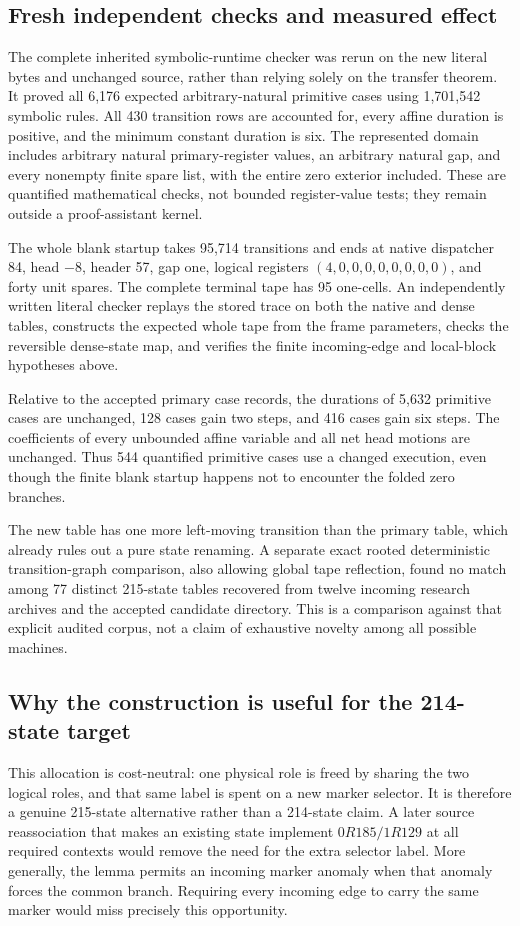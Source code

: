 \subsection{Fresh independent checks and measured effect}

The complete inherited symbolic-runtime checker was rerun on the new literal
bytes and unchanged source, rather than relying solely on the transfer theorem.
It proved all 6,176 expected arbitrary-natural primitive cases using
1,701,542 symbolic rules.  All 430 transition rows are accounted for, every
affine duration is positive, and the minimum constant duration is six.
The represented domain includes arbitrary natural primary-register values,
an arbitrary natural gap, and every nonempty finite spare list, with the
entire zero exterior included.  These are quantified mathematical checks,
not bounded register-value tests; they remain outside a proof-assistant kernel.

The whole blank startup takes 95,714 transitions and ends at native dispatcher
84, head $-8$, header 57, gap one, logical registers
$(4,0,0,0,0,0,0,0,0)$, and forty unit spares.  The complete terminal tape has
95 one-cells.  An independently written literal checker replays the stored
trace on both the native and dense tables, constructs the expected whole tape
from the frame parameters, checks the reversible dense-state map, and verifies
the finite incoming-edge and local-block hypotheses above.

Relative to the accepted primary case records, the durations of 5,632 primitive
cases are unchanged, 128 cases gain two steps, and 416 cases gain six steps.
The coefficients of every unbounded affine variable and all net head motions
are unchanged.  Thus 544 quantified primitive cases use a changed execution,
even though the finite blank startup happens not to encounter the folded zero
branches.

The new table has one more left-moving transition than the primary table,
which already rules out a pure state renaming.  A separate exact rooted
deterministic transition-graph comparison, also allowing global tape
reflection, found no match among 77 distinct 215-state tables recovered from
twelve incoming research archives and the accepted candidate directory.
This is a comparison against that explicit audited corpus, not a claim of
exhaustive novelty among all possible machines.

\subsection{Why the construction is useful for the 214-state target}

This allocation is cost-neutral: one physical role is freed by sharing the
two logical roles, and that same label is spent on a new marker selector.
It is therefore a genuine 215-state alternative rather than a 214-state
claim.  A later source reassociation that makes an existing state implement
$0R185/1R129$ at all required contexts would remove the need for the extra
selector label.  More generally, the lemma permits an incoming marker anomaly
when that anomaly forces the common branch.  Requiring every incoming edge
to carry the same marker would miss precisely this opportunity.
